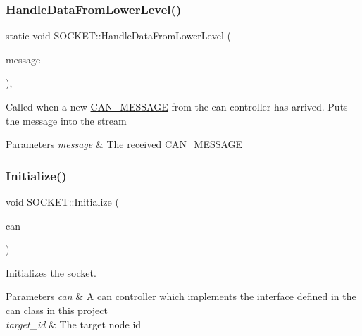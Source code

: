 \subsubsection{\texorpdfstring{Handle\+Data\+From\+Lower\+Level()}{HandleDataFromLowerLevel()}}
{\footnotesize\ttfamily static void S\+O\+C\+K\+E\+T\+::\+Handle\+Data\+From\+Lower\+Level (\begin{DoxyParamCaption}\item[{\hyperlink{struct_c_a_n___m_e_s_s_a_g_e}{C\+A\+N\+\_\+\+M\+E\+S\+S\+A\+GE} \&}]{message }\end{DoxyParamCaption})\hspace{0.3cm}{\ttfamily [inline]}, {\ttfamily [static]}}

Called when a new \hyperlink{struct_c_a_n___m_e_s_s_a_g_e}{C\+A\+N\+\_\+\+M\+E\+S\+S\+A\+GE} from the can controller has arrived. Puts the message into the stream 
\begin{DoxyParams}{Parameters}
{\em message} & The received \hyperlink{struct_c_a_n___m_e_s_s_a_g_e}{C\+A\+N\+\_\+\+M\+E\+S\+S\+A\+GE} \\
\hline
\end{DoxyParams}
\hypertarget{class_s_o_c_k_e_t_a69219c6c89e78afcd46df2e0af34a341}{}\label{class_s_o_c_k_e_t_a69219c6c89e78afcd46df2e0af34a341} 
\subsubsection{\texorpdfstring{Initialize()}{Initialize()}}
{\footnotesize\ttfamily void S\+O\+C\+K\+E\+T\+::\+Initialize (\begin{DoxyParamCaption}\item[{\hyperlink{class_c_a_n}{C\+AN} $\ast$}]{can }\end{DoxyParamCaption})\hspace{0.3cm}{\ttfamily [inline]}}

Initializes the socket. 
\begin{DoxyParams}{Parameters}
{\em can} & A can controller which implements the interface defined in the can class in this project \\
\hline
{\em target\+\_\+id} & The target node id \\
\hline
\end{DoxyParams}
\hypertarget{class_s_o_c_k_e_t_ad8ee6b81c9f30267406412a95264abed}{}\label{class_s_o_c_k_e_t_ad8ee6b81c9f30267406412a95264abed} 
